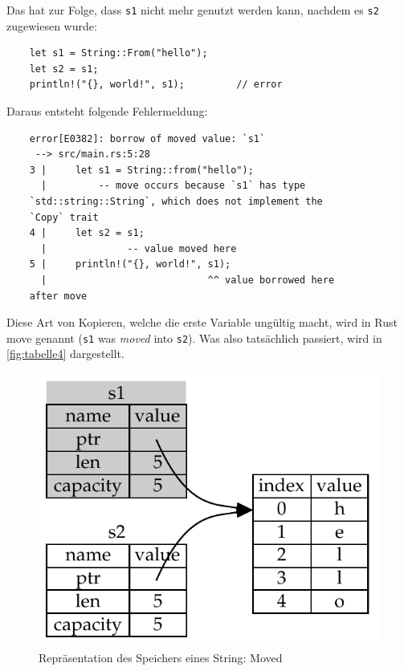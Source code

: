 Das hat zur Folge, dass \verb"s1" nicht mehr genutzt werden kann, nachdem es \verb"s2" zugewiesen wurde:

\begin{lstlisting}
    let s1 = String::From("hello");
    let s2 = s1;
    println!("{}, world!", s1);         // error
\end{lstlisting}

Daraus entsteht folgende Fehlermeldung:

\begin{lstlisting}
    error[E0382]: borrow of moved value: `s1`
     --> src/main.rs:5:28
    3 |     let s1 = String::from("hello");
      |         -- move occurs because `s1` has type
    `std::string::String`, which does not implement the
    `Copy` trait
    4 |     let s2 = s1;
      |              -- value moved here
    5 |     println!("{}, world!", s1);
      |                            ^^ value borrowed here
    after move
\end{lstlisting}

Diese Art von Kopieren, welche die erste Variable ungültig macht, wird in Rust \glqq move\grqq{} genannt (\verb"s1" was \textit{moved} into \verb"s2"). Was also tatsächlich passiert, wird in \autoref{fig:tabelle4} dargestellt.

\begin{figure}[htbp]
    \centering
    \includegraphics[scale=0.9]{Programmierung/Tabelle4.pdf}
    \caption{Repräsentation des Speichers eines String: Moved}
    \label{fig:tabelle4}
\end{figure}

